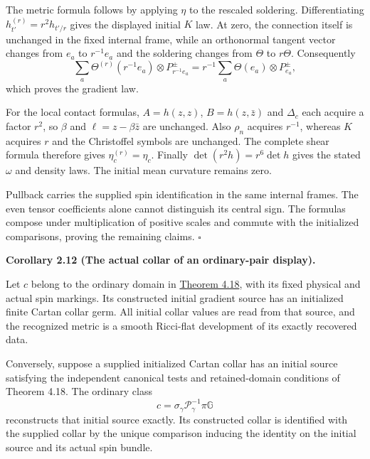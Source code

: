\documentclass[
  english,
  11pt,
  reqno]{amsart}
\makeatletter
\newcommand{\pandocstatementheading}[1]{%
  \par\if@nobreak\else
    \addpenalty{\@beginparpenalty}%
    \addvspace{.5\baselineskip plus .2\baselineskip minus .2\baselineskip}%
  \fi
  {\normalfont\bfseries #1\par}%
  \nobreak\@afterindenttrue\@afterheading
}
\makeatother
\begin{document}
The metric formula follows by applying \(\eta\) to the rescaled
soldering. Differentiating \(h^{(r)}_{t'}=r^2h_{t'/r}\) gives the
displayed initial \(K\) law. At zero, the connection itself is unchanged
in the fixed internal frame, while an orthonormal tangent vector changes
from \(e_a\) to \(r^{-1}e_a\) and the soldering changes from \(\Theta\)
to \(r\Theta\). Consequently \[
\sum_a\Theta^{(r)}(r^{-1}e_a)
\otimes P^\pm_{r^{-1}e_a}
=r^{-1}\sum_a\Theta(e_a)\otimes P^\pm_{e_a},
\] which proves the gradient law.

For the local contact formulas, \(A=h(z,z)\), \(B=h(z,\bar z)\) and
\(\Delta_c\) each acquire a factor \(r^2\), so \(\beta\) and
\(\ell=z-\beta\bar z\) are unchanged. Also \(\rho_n\) acquires
\(r^{-1}\), whereas \(K\) acquires \(r\) and the Christoffel symbols are
unchanged. The complete shear formula therefore gives
\(\eta_c^{(r)}=\eta_c\). Finally \(\det(r^2h)=r^6\det h\) gives the
stated \(\omega\) and density laws. The initial mean curvature remains
zero.

Pullback carries the supplied spin identification in the same internal
frames. The even tensor coefficients alone cannot distinguish its
central sign. The formulas compose under multiplication of positive
scales and commute with the initialized comparisons, proving the
remaining claims. \hfill\(\square\)

\pandocstatementheading{\leavevmode{}\label{cor:online-ordinary-pair-cartan-collar}Corollary 2.12 (The actual collar of an ordinary-pair display).}

Let \(c\) belong to the ordinary domain in
\hyperref[thm:online-ordinary-negative-response-initial-source]{Theorem
4.18}, with its fixed physical and actual spin markings. Its constructed
initial gradient source has an initialized finite Cartan collar germ.
All initial collar values are read from that source, and the recognized
metric is a smooth Ricci-flat development of its exactly recovered data.

Conversely, suppose a supplied initialized Cartan collar has an initial
source satisfying the independent canonical tests and retained-domain
conditions of Theorem 4.18. The ordinary class%
 \[
c=\sigma_\gamma\mathscr P_\gamma^{-1}\pi\mathbb G
\] reconstructs that initial source exactly. Its constructed collar is
identified with the supplied collar by the unique comparison inducing
the identity on the initial source and its actual spin bundle.
\end{document}
